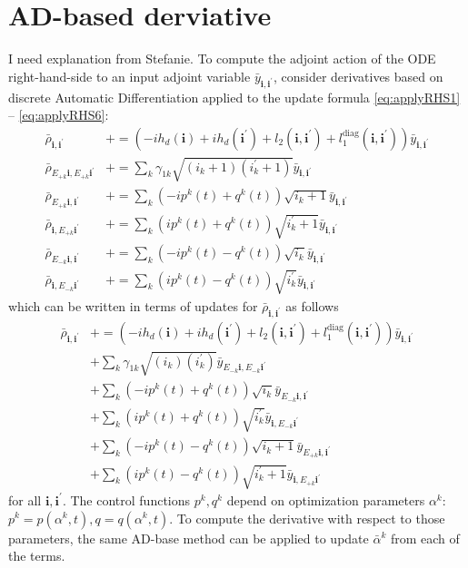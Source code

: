 \documentclass[letterpaper]{article}
\newcommand{\bfi}{\boldsymbol{i}}
\newcommand{\p}{\prime}
\newcommand{\Epk}{E_{+k}}
\newcommand{\Emk}{E_{-k}}
\newcommand{\pluseq}{\mathrel{+}=}
\newcommand{\YC}[1]{{\textcolor{Bronze}{#1}}}
\begin{document}
\section{AD-based derviative}
\YC{I need explanation from Stefanie.}
To compute the adjoint action of the ODE right-hand-side to an input adjoint
variable $\bar y_{\bfi, \bfi^\p}$, consider derivatives based on discrete
Automatic Differentiation applied to the update formula
\YC{\eqref{eq:applyRHS1}} -- \eqref{eq:applyRHS6}:
\begin{align} 
  \bar \rho_{\bfi, \bfi^\p} &\pluseq \left(-i h_d(\bfi) + ih_d(\bfi^\prime) +
  l_2(\bfi,\bfi^\prime) + l_1^{\text{diag}}(\bfi, \bfi^\prime) \right) \bar
  y_{\bfi,\bfi^\prime} \\
  \bar \rho_{E_{+k}\bfi, E_{+k}\bfi^\prime} &\pluseq \sum_k \gamma_{1k}
  \sqrt{(i_k+1)(i_k^\prime+1)} \bar y_{\bfi, \bfi^\p} \\
  \bar \rho_{\Epk \bfi, \bfi^\prime} &\pluseq \sum_k \left(-ip^k(t) +
  q^k(t)\right) \sqrt{i_k+1} \bar y_{\bfi, \bfi^\p} \\
  \bar \rho_{\bfi,\Epk \bfi^\prime} &\pluseq \sum_k \left( ip^k(t) +
  q^k(t)\right) \sqrt{i_k^\prime+1} \bar y_{\bfi, \bfi^\p} \\
  \bar \rho_{\Emk \bfi, \bfi^\prime} &\pluseq \sum_k \left(-ip^k(t) -
  q^k(t)\right) \sqrt{i_k} \bar y_{\bfi, \bfi^\p} \\
  \bar \rho_{\bfi,\Emk \bfi^\prime} &\pluseq \sum_k \left( ip^k(t) -
  q^k(t)\right) \sqrt{i_k^\prime} \bar y_{\bfi, \bfi^\p}
\end{align}
which can be written in terms of updates for $\bar \rho_{\bfi, \bfi^\p}$ as
follows
\begin{align} 
  \bar \rho_{\bfi, \bfi^\p} &\pluseq \left(-i h_d(\bfi) + ih_d(\bfi^\prime) +
  l_2(\bfi,\bfi^\prime) + l_1^{\text{diag}}(\bfi, \bfi^\prime) \right) \bar
  y_{\bfi,\bfi^\prime} \\
   &+ \sum_k \gamma_{1k} \sqrt{(i_k)(i_k^\prime)} \bar y_{E_{-k}\bfi,
   E_{-k}\bfi^\p} \\
   &+ \sum_k \left(-ip^k(t) + q^k(t)\right) \sqrt{i_k} \bar y_{\Emk\bfi,
   \bfi^\p} \\
   &+ \sum_k \left( ip^k(t) + q^k(t)\right) \sqrt{i_k^\prime} \bar y_{\bfi, \Emk
   \bfi^\p} \\
   &+ \sum_k \left(-ip^k(t) - q^k(t)\right) \sqrt{i_k+1} \bar y_{\Epk \bfi,
   \bfi^\p} \\
   &+ \sum_k \left( ip^k(t) - q^k(t)\right) \sqrt{i_k^\prime+1} \bar y_{\bfi,
   \Epk\bfi^\p}
\end{align}
for all $\bfi, \bfi^\p$.
The control functions $p^k, q^k$ depend on optimization parameters $\alpha^k$:
$p^k = p(\alpha^k,t), q = q(\alpha^k,t)$. To compute the derivative with respect
to those parameters, the same AD-base method can be applied to update $\bar
\alpha^k$ from each of the terms.
\end{document}
